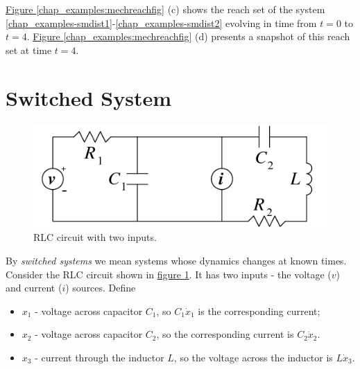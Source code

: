 \documentclass[letterpaper,10pt,english]{sphinxmanual}
\begin{document}
\hyperref[chap_examples:mechreachfig]{Figure  \ref*{chap_examples:mechreachfig}} (c) shows the reach set of the system
\eqref{chap_examples-smdist1}-\eqref{chap_examples-smdist2} evolving in time from $t=0$ to $t=4$.
\hyperref[chap_examples:mechreachfig]{Figure  \ref*{chap_examples:mechreachfig}} (d) presents a snapshot of this reach set at time
$t=4$.


\section{Switched System}
\label{chap_examples:switched-system}\begin{figure}[htbp]
\centering
\capstart

\includegraphics[width=0.300\linewidth]{chapter06_section03_rlc.png}
\caption{RLC circuit with two inputs.}\label{chap_examples:rlcfig}\end{figure}

By \emph{switched systems} we mean systems whose dynamics changes at known
times. Consider the RLC circuit shown in \hyperref[chap_examples:rlcfig]{figure  \ref*{chap_examples:rlcfig}}. It has two
inputs - the voltage ($v$) and current ($i$) sources. Define
\begin{itemize}
\item {} 
$x_1$ - voltage across capacitor $C_1$, so
$C_1\dot{x}_1$ is the corresponding current;

\item {} 
$x_2$ - voltage across capacitor $C_2$, so the
corresponding current is $C_2\dot{x}_2$.

\item {} 
$x_3$ - current through the inductor $L$, so the voltage
across the inductor is $L\dot{x}_3$.

\end{itemize}
\end{document}
